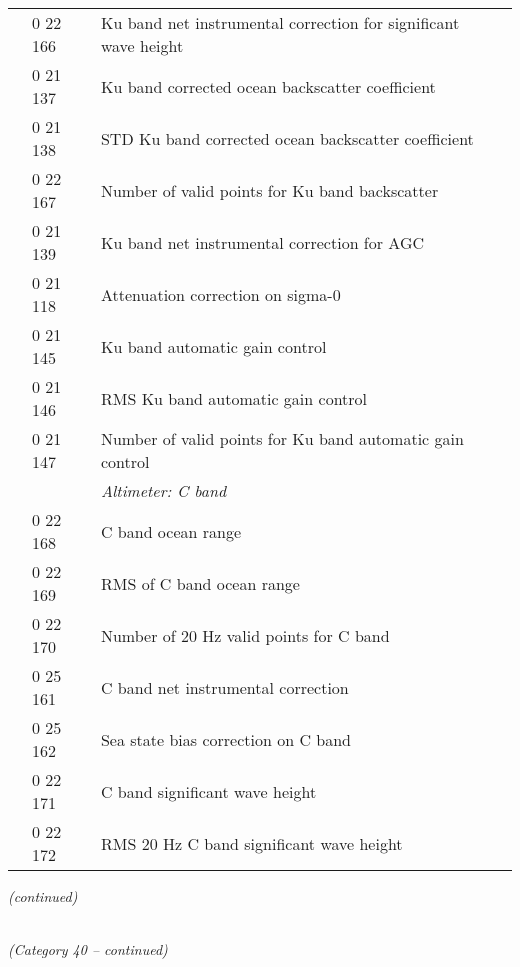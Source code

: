 \begin{longtable}[]{@{}llll@{}}
& 0 22 166 & Ku band net instrumental correction for significant wave height &\tabularnewline
& 0 21 137 & Ku band corrected ocean backscatter coefficient &\tabularnewline
& 0 21 138 & STD Ku band corrected ocean backscatter coefficient &\tabularnewline
& 0 22 167 & Number of valid points for Ku band backscatter &\tabularnewline
& 0 21 139 & Ku band net instrumental correction for AGC &\tabularnewline
& 0 21 118 & Attenuation correction on sigma-0 &\tabularnewline
& 0 21 145 & Ku band automatic gain control &\tabularnewline
& 0 21 146 & RMS Ku band automatic gain control &\tabularnewline
& 0 21 147 & Number of valid points for Ku band automatic gain control &\tabularnewline
& & \emph{Altimeter: C band} &\tabularnewline
& 0 22 168 & C band ocean range &\tabularnewline
& 0 22 169 & RMS of C band ocean range &\tabularnewline
& 0 22 170 & Number of 20 Hz valid points for C band &\tabularnewline
& 0 25 161 & C band net instrumental correction &\tabularnewline
& 0 25 162 & Sea state bias correction on C band &\tabularnewline
& 0 22 171 & C band significant wave height &\tabularnewline
& 0 22 172 & RMS 20 Hz C band significant wave height &\tabularnewline
\bottomrule
\end{longtable}

\emph{(continued)}

\emph{\\
(Category 40 -- continued)}

